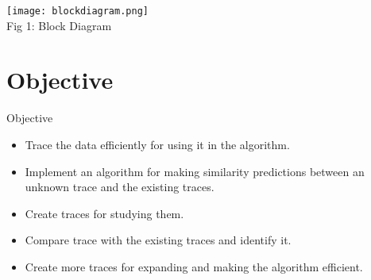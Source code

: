 \documentclass{beamer}
\begin{document}
\begin{frame}{}
    \begin{center}
        \texttt{[image: blockdiagram.png]}\\
        Fig 1: Block Diagram
    \end{center}    
\end{frame}


\section{Objective}
\begin{frame}{Objective}
    \begin{itemize}
        \item Trace the data efficiently for using it in the algorithm.
        \item Implement an algorithm for making similarity predictions between an unknown trace and the existing traces.
        \item Create traces for studying them.
        \item Compare trace with the existing traces and identify it.
        \item Create more traces for expanding and making the algorithm efficient.
    \end{itemize}
\end{frame}
\end{document}
